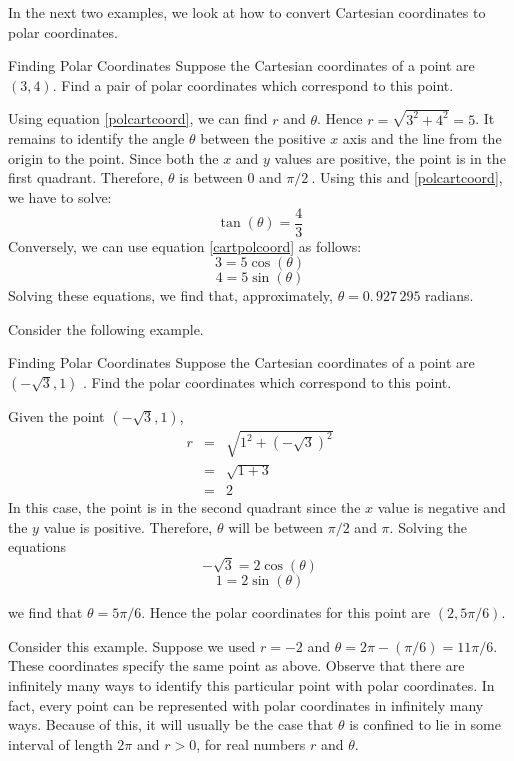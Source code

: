 In the next two examples, we look at how to convert Cartesian coordinates to polar coordinates. 

\begin{example}{Finding Polar Coordinates}{}
Suppose the Cartesian coordinates of a point are $\left( 3,4\right) $. Find
a pair of polar coordinates which correspond to this point.
\end{example}

\begin{solution}
Using equation \ref{polcartcoord}, we can find $r$ and $\theta$. Hence $r=\sqrt{3^{2}+4^{2}}=5$. It remains to identify the angle $\theta$ between the positive $x$ axis and the line from the origin to the point. Since both the $x$ and $y$ values are positive, the point is in the
first quadrant. Therefore, $\theta$ is between $0$ and $\pi /2\ $. 
Using this and \ref{polcartcoord}, we have to solve:
\[
\tan\left(\theta \right)=\frac{4}{3}
\]
Conversely, we can use equation \ref{cartpolcoord} as follows:
\[
3=5\cos \left( \theta \right) 
\]
\[
4 = 5\sin \left( \theta \right) 
\]
Solving these equations, we find that, 
approximately, $\theta =0.\, 927\,295$ radians.
\end{solution}

Consider the following example.

\begin{example}{Finding Polar Coordinates}{}
Suppose the Cartesian coordinates of a point are $\left( -\sqrt{3},1\right)$
. Find the polar coordinates which correspond to this point.
\end{example}

\begin{solution}
Given the point $\left( -\sqrt{3}, 1\right)$, 
\begin{eqnarray*}
r &=& \sqrt{ 1^2 + (-\sqrt{3})^2}\\
&=& \sqrt{1 + 3}\\
&=&2
\end{eqnarray*}
 In this case, the point is in the second quadrant since the $x$ value is negative and the $y$ value is positive. Therefore, $\theta$ will be between $\pi/2$ and $\pi$.
Solving the equations
\[
-\sqrt{3}= 2 \cos \left(\theta\right)
\]
\[
1 = 2 \sin \left( \theta\right) 
\]

we find that $\theta = 5\pi /6.$
Hence the polar coordinates for this point are $\left(2, 5\pi /6 \right)$.
\end{solution}

Consider this example. Suppose we used $r=-2$ and $\theta =2\pi -\left( \pi /6\right) = 11\pi /6 $. These coordinates specify the same point as above. Observe that there are infinitely many ways to identify this
particular point with polar coordinates. In fact, every point can be represented with polar coordinates in infinitely many ways. Because of this, it will usually be
the case that $\theta $ is confined to lie in some interval
of length $2\pi $ and $r>0$, for real numbers $r$ and $\theta $. 

